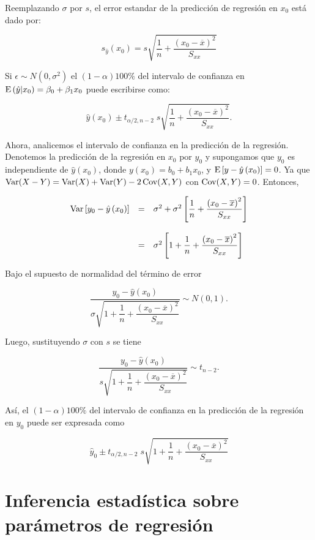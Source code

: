 Reemplazando $\sigma$ por $s$, el error estandar de la predicción de regresión en $x_0$ está dado por:

$$s_{\hat{y}}\left(x_0\right)=s\sqrt{\dfrac{1}{n}+\dfrac{\left(x_0-\overline{x}\right)^2}{S_{xx}}}$$

Si $\epsilon\sim N\left(0, \sigma^2\right)$ el $(1-\alpha)100\%$ del intervalo de confianza en $\mathop{\mbox{\normalfont E}}\nolimits\left(\hat{y}|x_0\right)=\beta_0+\beta_1x_0$ puede escribirse como:


$$\hat{y}\left(x_0\right)\pm t_{\alpha/2,n-2}\;s\sqrt{\dfrac{1}{n}+\dfrac{\left(x_0-\overline{x}\right)^2}{S_{xx}}}.$$

Ahora, analicemos el intervalo de confianza en la predicción de la regresión. Denotemos la predicción de la regresión en $x_0$ por $y_0$ y supongamos que $y_0$ es independiente de $\hat{y}\left(x_0\right)$, donde $y\left(x_0\right)=b_0+b_1x_0$, y $\mathop{\mbox{\normalfont E}}\nolimits\left[y-\hat{y}\left(x_0\right)\right]=0$. Ya que $\mathop{\mbox{\normalfont Var}}\nolimits(X-Y)=\mathop{\mbox{\normalfont Var}}\nolimits(X)+\mathop{\mbox{\normalfont Var}}\nolimits(Y)-2\mathop{\mbox{\normalfont Cov}}\nolimits(X,Y)$ con $\mathop{\mbox{\normalfont Cov}}\nolimits(X,Y)=0$. Entonces,

$$
\begin{array}{rcl}
    \mathop{\mbox{\normalfont Var}}\nolimits\left[y_0-\hat{y}\left(x_0\right)\right] &=& \sigma^2+\sigma^2\left[\dfrac{1}{n}+\dfrac{\left(x_0-\overline{x}\right)^2}{S_{xx}}\right]\\\\
						 &=& \sigma^2\left[1+\dfrac{1}{n}+\dfrac{\left(x_0-\overline{x}\right)^2}{S_{xx}}\right]
\end{array}
$$

Bajo el supuesto de normalidad del término de error

$$\dfrac{y_0-\hat{y}\left(x_0\right)}{\sigma\sqrt{1+\dfrac{1}{n}+\dfrac{\left(x_0-\overline{x}\right)^2}{S_{xx}}}}\sim N(0,1).$$

Luego, sustituyendo $\sigma$ con $s$ se tiene

$$\dfrac{y_0-\hat{y}\left(x_0\right)}{s\sqrt{1+\dfrac{1}{n}+\dfrac{\left(x_0-\overline{x}\right)^2}{S_{xx}}}}\sim t_{n-2}.$$

Así, el $(1-\alpha)100\%$ del intervalo de confianza en la predicción de la regresión en $y_0$ puede ser expresada como

$$\hat{y}_0\pm t_{\alpha/2,n-2}\; s \sqrt{1+\dfrac{1}{n}+\dfrac{\left(x_0-\overline{x}\right)^2}{S_{xx}}}$$


\section{Inferencia estadística sobre parámetros de regresión}
